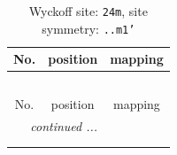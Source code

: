 \documentclass[fleqn,8pt]{jsarticle}
\begin{document}
\renewcommand{\arraystretch}{1.2}
\begin{longtable}{ccc}
\caption{Wyckoff site: {\tt 24m}, site symmetry: {\tt ..m1'}}
 \\
 \hline \hline
No. & position & mapping \\ \hline \endfirsthead

\multicolumn{2}{l}{\tablename\ \thetable{}} \\
 \hline \hline
No. & position & mapping \\ \hline \endhead

 \hline \hline
\multicolumn{2}{r}{\footnotesize\it continued ...} \\ \endfoot

 \hline \hline
\multicolumn{2}{r}{} \\ \endlastfoot


\end{longtable}
\end{document}
